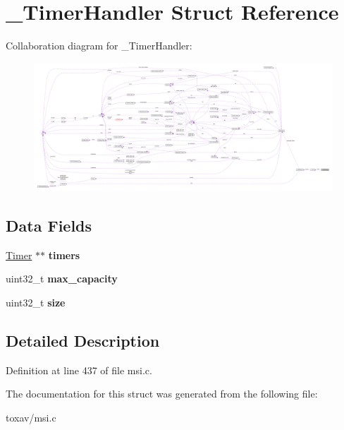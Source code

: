 \hypertarget{struct___timer_handler}{\section{\+\_\+\+Timer\+Handler Struct Reference}
\label{struct___timer_handler}
}


Collaboration diagram for \+\_\+\+Timer\+Handler\+:
\nopagebreak
\begin{figure}[H]
\begin{center}
\leavevmode
\includegraphics[width=350pt]{struct___timer_handler__coll__graph}
\end{center}
\end{figure}
\subsection*{Data Fields}
\begin{DoxyCompactItemize}
\item 
\hypertarget{struct___timer_handler_af6a69553fb8462326147c121a4c3e98c}{\hyperlink{struct___timer}{Timer} $\ast$$\ast$ {\bfseries timers}}\label{struct___timer_handler_af6a69553fb8462326147c121a4c3e98c}

\item 
\hypertarget{struct___timer_handler_a75d656828e87eb82559cb02fa2219d98}{uint32\+\_\+t {\bfseries max\+\_\+capacity}}\label{struct___timer_handler_a75d656828e87eb82559cb02fa2219d98}

\item 
\hypertarget{struct___timer_handler_ab2c6b258f02add8fdf4cfc7c371dd772}{uint32\+\_\+t {\bfseries size}}\label{struct___timer_handler_ab2c6b258f02add8fdf4cfc7c371dd772}

\end{DoxyCompactItemize}


\subsection{Detailed Description}


Definition at line 437 of file msi.\+c.



The documentation for this struct was generated from the following file\+:\begin{DoxyCompactItemize}
\item 
toxav/msi.\+c\end{DoxyCompactItemize}
